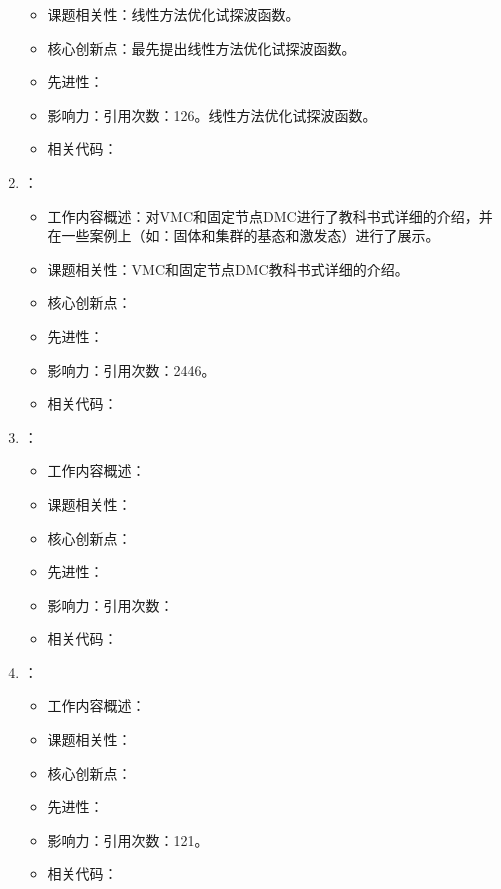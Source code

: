 \begin{enumerate}
\begin{itemize}
            \item 课题相关性：线性方法优化试探波函数。
            \item 核心创新点：最先提出线性方法优化试探波函数。
            \item 先进性：
            \item 影响力：引用次数：126。线性方法优化试探波函数。
            \item 相关代码：
        \end{itemize}
        \item \citet{foulkes2001quantum}：
            \begin{itemize}
                \item 工作内容概述：对VMC和固定节点DMC进行了教科书式详细的介绍，并在一些案例上（如：固体和集群的基态和激发态）进行了展示。
                \item 课题相关性：VMC和固定节点DMC教科书式详细的介绍。
                \item 核心创新点：
                \item 先进性：
                \item 影响力：引用次数：2446。
                \item 相关代码：
            \end{itemize}
        \item \citet{santoro2002theory}：
            \begin{itemize}
                \item 工作内容概述：
                \item 课题相关性：
                \item 核心创新点：
                \item 先进性：
                \item 影响力：引用次数：
                \item 相关代码：
            \end{itemize}
        \item \citet{casula2005diffusion}：
            \begin{itemize}
                \item 工作内容概述：
                \item 课题相关性：
                \item 核心创新点：
                \item 先进性：
                \item 影响力：引用次数：121。
                \item 相关代码：
            \end{itemize}

\end{enumerate}
